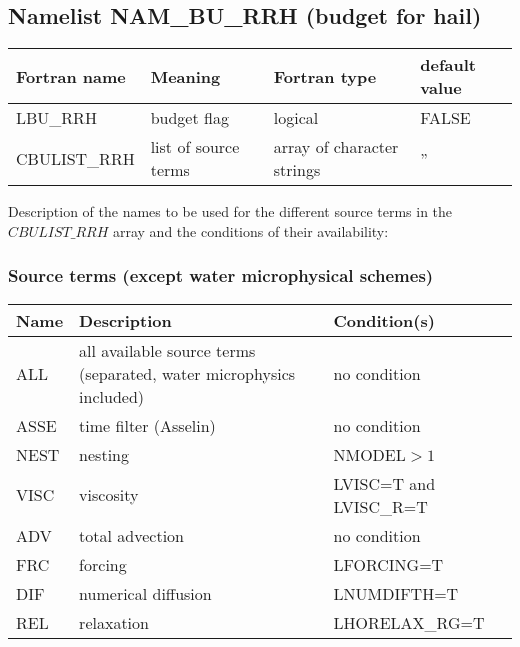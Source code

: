 \subsection{Namelist NAM\_BU\_RRH (budget for hail)}

\begin{longtable} {|p{}|p{}|>{\centering}p{}|p{}<{\centering}|}
\hline
Fortran name & Meaning & Fortran type & default value \\
\hline \hline
\endhead
LBU\_RRH & budget flag & logical & FALSE\index{LBU\_RRH!\innam{NAM\_BU\_RRH}} \\\hline
CBULIST\_RRH & list of source terms & array of character strings & ''\index{CBULIST\_RRH!\innam{NAM\_BU\_RRH}} \\\hline
\end{longtable}

Description of the names to be used for the different source terms in the $CBULIST\_RRH$ array and the conditions of their availability:

\subsubsection{Source terms (except water microphysical schemes)}

\begin{longtable} {|p{}|p{}|p{}|}
\hline
Name & Description & Condition(s) \\
\hline \hline
\endhead
ALL    & all available source terms (separated,  water microphysics included) & no condition \\\hline \hline
ASSE   & time filter (Asselin) & no condition           \\\hline
NEST   & nesting               & NMODEL$>1$             \\\hline
VISC   & viscosity             & LVISC=T and LVISC\_R=T \\\hline
ADV    & total advection       & no condition           \\\hline
FRC    & forcing               & LFORCING=T             \\\hline
DIF    & numerical diffusion   & LNUMDIFTH=T            \\\hline
REL    & relaxation            & LHORELAX\_RG=T         \\\hline
\end{longtable}


